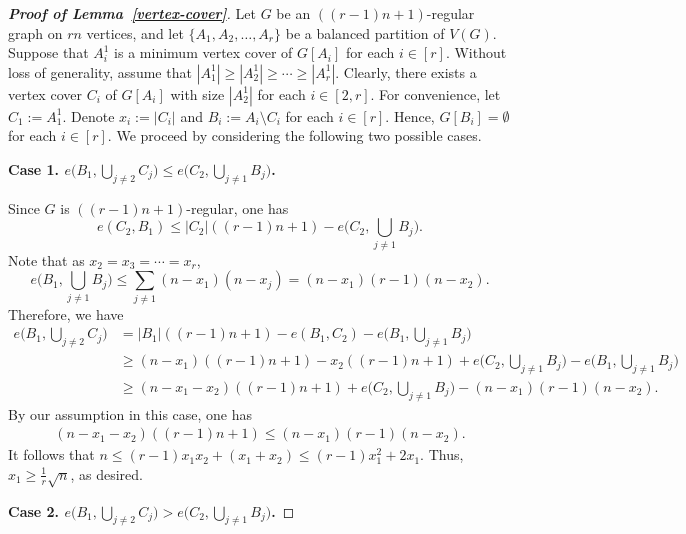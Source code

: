 \documentclass[10pt,a4paper]{amsart}
\begin{document}
\begin{proof}[\bf Proof of Lemma~\ref{vertex-cover}]
Let $G$ be an $((r-1)n+1)$-regular graph on $rn$ vertices, and let $\{A_1,A_2,\ldots,A_r\}$ be a balanced partition of $V(G)$. Suppose that $A_i^1$ is a minimum vertex cover of $G[A_i]$ for each $i\in [r]$. Without loss of generality, assume that $|A_1^1|\geq |A_2^1|\geq \cdots \geq |A_r^1|$. Clearly, there exists a vertex cover $C_i$ of $G[A_i]$ with size $|A_2^1|$ for each $i\in [2,r]$. For convenience, let $C_1:=A_1^1$. Denote $x_i:=|C_i|$ and $B_i:=A_i\setminus C_i$ for each $i\in [r]$. Hence, $G[B_i]=\emptyset$ for each $i\in [r]$. We proceed by considering the following two possible cases. 

\medskip
{\bf Case 1. $e\Big(B_1,\bigcup_{j\neq 2}C_j\Big)\leq e\Big(C_2,\bigcup_{j\neq 1}B_j\Big)$.}
\medskip

Since $G$ is  $((r-1)n+1)$-regular, one has 
$$
e(C_2,B_1)\leq |C_2|((r-1)n+1)-e\Big(C_2,\bigcup_{j\neq 1}B_j\Big).
$$
Note that as $x_2=x_3=\cdots=x_r$,
$$
e\Big(B_1,\bigcup_{j\neq 1}B_j\Big)\le\sum_{j\neq1}(n-x_1)(n-x_j)=(n-x_1)(r-1)(n-x_2).
$$
Therefore, we have
\begin{align*}
e\Big(B_1,\bigcup_{j\neq 2}C_j\Big)&=|B_1|((r-1)n+1)-e(B_1,C_2)-e\Big(B_1,\bigcup_{j\neq 1}B_j\Big)\\
&\geq (n-x_1)((r-1)n+1)-x_2((r-1)n+1)+e\Big(C_2,\bigcup_{j\neq 1}B_j\Big)-e\Big(B_1,\bigcup_{j\neq 1}B_j\Big)\\
&\geq (n-x_1-x_2)((r-1)n+1)+e\Big(C_2,\bigcup_{j\neq 1}B_j\Big)-(n-x_1)(r-1)(n-x_2).
\end{align*}
By our assumption in this case, one has
\begin{align*}
(n-x_1-x_2)((r-1)n+1)\leq (n-x_1)(r-1)(n-x_2).
\end{align*}
It follows that $n\leq (r-1)x_1x_2+(x_1+x_2)\leq (r-1)x_1^2+2x_1.$ Thus, $x_1\geq \frac{1}{r}\sqrt{n}$, as desired.

\medskip
{\bf Case 2. $e\Big(B_1,\bigcup_{j\neq 2}C_j\Big)> e\Big(C_2,\bigcup_{j\neq 1}B_j\Big)$.}
\medskip


\end{proof}
\end{document}
